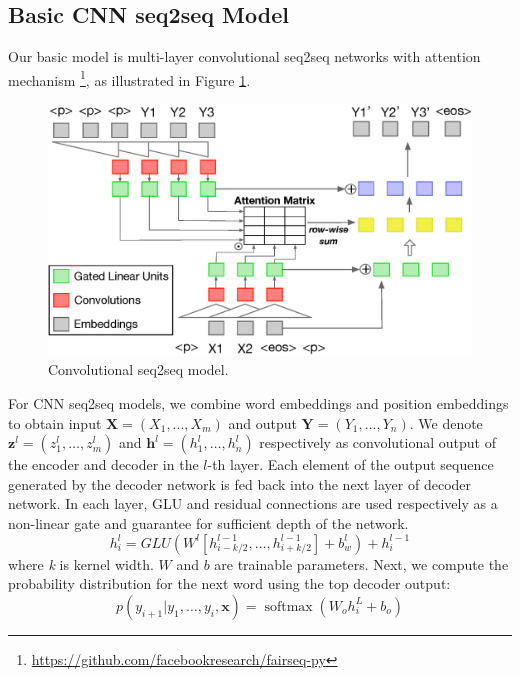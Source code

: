 \documentclass{nle}
\theoremstyle{definition}
\newcommand{\figref}[1]{Figure \ref{#1}}
\begin{document}
\subsection{Basic CNN seq2seq Model}
\label{sec:basic}
Our basic model is multi-layer convolutional seq2seq networks \citep{gehring2017convs2s} with attention mechanism
\footnote{\url{https://github.com/facebookresearch/fairseq-py}}, 
as illustrated in \figref{fig:basicModel}. 

\begin{figure}[th]
	\centering
	\includegraphics[width=0.8\linewidth]{cnn}
	\caption{Convolutional seq2seq model.}
	\label{fig:basicModel}
\end{figure}

For CNN seq2seq models, we combine word embeddings and position embeddings to obtain input $\mathbf{X} = (X_1,...,X_m)$ and output $\mathbf{Y}=(Y_1,...,Y_n)$. 
We denote $\mathbf { z } ^ { l } = \left( z _ { 1 } ^ { l } , \ldots , z _ { m     } ^ { l } \right)$ and $\mathbf { h } ^ { l } = \left( h _ { 1 } ^ { l } , \ldots , h _ { n } ^ { l } \right)$ 
respectively as convolutional output of the encoder and
decoder in the $l$-th layer.
Each element of the output
sequence generated by the decoder network is fed
back into the next layer of decoder network.
In each layer, GLU \citep{DauphinFAG17} and residual connections \citep{HeZRS16}
are used respectively as a non-linear gate and guarantee for sufficient depth of the network.  
\begin{equation}
	h _ { i } ^ { l } = GLU \left( W ^ { l } \left[ h _ {i-k/2 } ^ { l - 1 } , \ldots , h _ { i+k/2 } ^ { l - 1 } \right] + b _ { w } ^ { l } \right) + h _ { i } ^ { l - 1 }
\end{equation} 
where \textit{k} is kernel width. $W$ and $b$ are trainable parameters.
Next, we compute the probability distribution for the next word
using the top decoder output:
\begin{equation}
	p \left( y _ { i + 1 } | y _ { 1 } , \ldots , y _ { i } , \mathbf { x } \right) = \operatorname { softmax } \left( W _ { o } h _ { i } ^ { L } + b _ { o } \right)
\end{equation}
\end{document}
